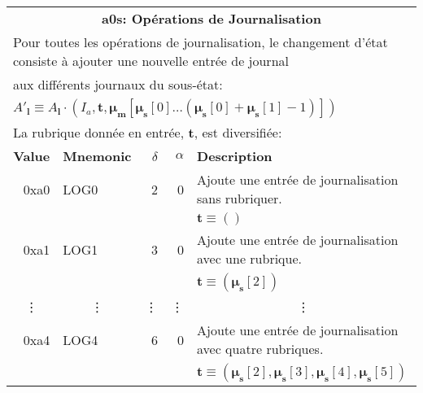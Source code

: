 \documentclass[9pt,oneside]{amsart}
\begin{document}
\begin{tabular*}{\columnwidth}[h]{rlrrl}
\toprule
\multicolumn{5}{c}{\textbf{a0s: Opérations de Journalisation }} \vspace{5pt} \\
\multicolumn{5}{l}{Pour toutes les opérations de journalisation, le changement d'état consiste à ajouter une nouvelle entrée de journal}\\
\multicolumn{5}{l}{aux différents journaux du sous-état:}\\
\multicolumn{5}{l}{$A'_\mathbf{l} \equiv A_\mathbf{l} \cdot (I_a, \mathbf{t}, \boldsymbol{\mu}_\mathbf{m}[ \boldsymbol{\mu}_\mathbf{s}[0] \dots (\boldsymbol{\mu}_\mathbf{s}[0] + \boldsymbol{\mu}_\mathbf{s}[1] - 1) ])$}\\
\multicolumn{5}{l}{La rubrique donnée en entrée, $\mathbf{t}$, est diversifiée:}\vspace{5pt} \\
\textbf{Value} & \textbf{Mnemonic} & $\delta$ & $\alpha$ & \textbf{Description} \vspace{5pt} \\
0xa0 & {\small LOG0} & 2 & 0 & Ajoute une entrée de journalisation sans rubriquer. \\
&&&& $\mathbf{t} \equiv ()$ \\
\midrule
0xa1 & {\small LOG1} & 3 & 0 & Ajoute une entrée de journalisation avec une rubrique. \\
&&&& $\mathbf{t} \equiv (\boldsymbol{\mu}_\mathbf{s}[2])$ \\
\midrule
\multicolumn{1}{c}{\vdots} & \multicolumn{1}{c}{\vdots} & \vdots & \vdots & \multicolumn{1}{c}{\vdots} \\
\midrule
0xa4 & {\small LOG4} & 6 & 0 & Ajoute une entrée de journalisation avec quatre rubriques. \\
&&&& $\mathbf{t} \equiv (\boldsymbol{\mu}_\mathbf{s}[2], \boldsymbol{\mu}_\mathbf{s}[3], \boldsymbol{\mu}_\mathbf{s}[4], \boldsymbol{\mu}_\mathbf{s}[5])$ \\
\bottomrule
\end{tabular*}
\end{document}
